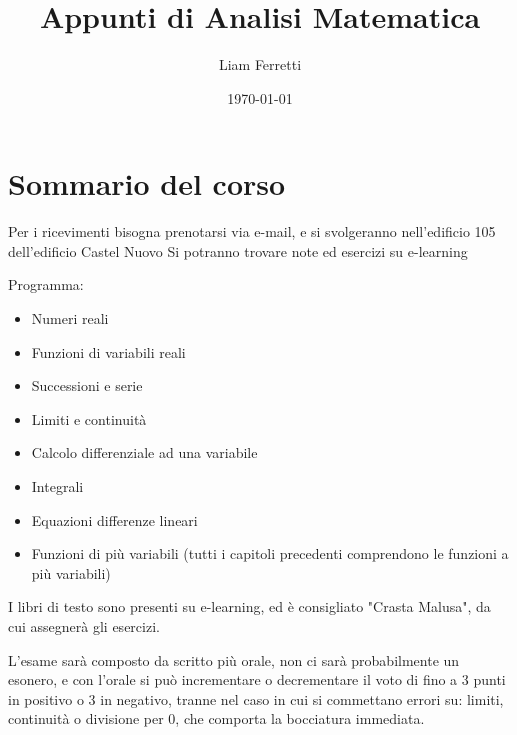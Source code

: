 \documentclass[a4paper, 12pt, openany]{book}
\title{Appunti di Analisi Matematica}
\author{Liam Ferretti}
\date{\today}
\begin{document}
	
	\maketitle
	
	\chapter*{Sommario del corso}
	Per i ricevimenti bisogna prenotarsi via e-mail, e si svolgeranno nell'edificio 105 dell'edificio Castel Nuovo
	Si potranno trovare note ed esercizi su e-learning
	
	Programma:
	\begin{itemize}
	\item Numeri reali  
	\item Funzioni di variabili reali  
	\item Successioni e serie
	\item Limiti e continuità
	\item Calcolo differenziale ad una variabile  
	\item Integrali
	\item Equazioni differenze lineari  
	\item Funzioni di più variabili (tutti i capitoli precedenti comprendono le funzioni a più variabili)
	\end{itemize}
	I libri di testo sono presenti su e-learning, ed è consigliato "Crasta Malusa", da cui assegnerà gli esercizi.
	
	L'esame sarà composto da scritto più orale, non ci sarà probabilmente un esonero, e con l'orale si può incrementare o decrementare il voto di fino a 3 punti in positivo o 3 in negativo, tranne nel caso in cui si commettano errori su: limiti, continuità o divisione per 0, che comporta la bocciatura immediata.
	
	\newpage
	\tableofcontents
	\clearpage
	
\end{document}

